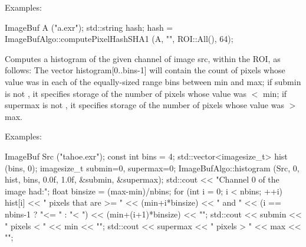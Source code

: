 \smallskip
\noindent Examples:
\begin{code}
    ImageBuf A ("a.exr");
    std::string hash;
    hash = ImageBufAlgo::computePixelHashSHA1 (A, "", ROI::All(), 64);
\end{code}
\apiend

 
Computes a histogram of the given {\cf channel} of image {\cf src},
within the ROI,
as follows: The vector {\cf histogram[0..bins-1]} will contain the
count of pixels whose value was in each of the equally-sized range
bins between {\cf min} and {\cf max}; if {\cf submin} is not \NULL,
it specifies storage of the number of pixels whose value was
$<$ {\cf min}; if {\cf supermax} is not \NULL, it specifies storage of
the number of pixels whose value was $>$ {\cf max}.

\smallskip
\noindent Examples:
\begin{code}
    ImageBuf Src ("tahoe.exr");
    const int bins = 4;
    std::vector<imagesize_t> hist (bins, 0);
    imagesize_t submin=0, supermax=0;
    ImageBufAlgo::histogram (Src, 0, hist, bins, 0.0f, 1.0f,
                             &submin, &supermax);
    std::cout << "Channel 0 of the image had:\n";
    float binsize = (max-min)/nbins;
    for (int i = 0;  i < nbins;  ++i)
        hist[i] << " pixels that are >= " << (min+i*binsize) << " and "
                << (i == nbins-1 ? "<= " : "< ")
                << (min+(i+1)*binsize) << "\n";
    std::cout << submin << " pixels < " << min << "\n";
    std::cout << supermax << " pixels > " << max << "\n";
\end{code}
\apiend


\begin{comment}
\apiitem{bool {\ce histogram_draw} (ImageBuf \&dst, 
  \bigspc const std::vector<imagesize_t> \&histogram)}
\index{ImageBufAlgo!histogram_draw} \indexapi{histogram_draw}
\smallskip
\noindent Examples:
\begin{code}
\end{code}
\apiend
\end{comment}


